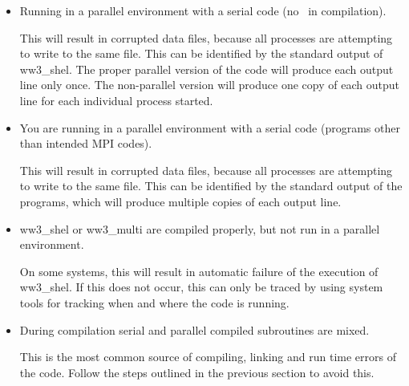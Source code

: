 \begin{itemize}
\item Running in a parallel environment with a serial code (no
      \mpi\ in compilation). \\ \vspace{-3mm}

   This will result in corrupted data files, because all processes are
   attempting to write to the same file. This can be identified by the
   standard output of {\file ww3\_shel}. The proper parallel version of the
   code will produce each output line only once. The non-parallel version will
   produce one copy of each output line for each individual process started.

\item You are running in a parallel environment with a serial code (programs
   other than intended MPI codes). \\ \vspace{-3mm}

   This will result in corrupted data files, because all processes are
   attempting to write to the same file. This can be identified by the
   standard output of the programs, which will produce multiple copies of each
   output line.

\item {\file ww3\_shel} or {\file ww3\_multi} are compiled properly, but not
   run in a parallel environment. \\ \vspace{-3mm}

   On some systems, this will result in automatic failure of the execution of
   {\code ww3\_shel}. If this does not occur, this can only be traced by
   using system tools for tracking when and where the code is running.

\item During compilation serial and parallel compiled subroutines are mixed.
      \\ \vspace{-3mm}

   This is the most common source of compiling, linking and run time errors
   of the code. Follow the steps outlined in the previous section to avoid
   this. 

\end{itemize}


